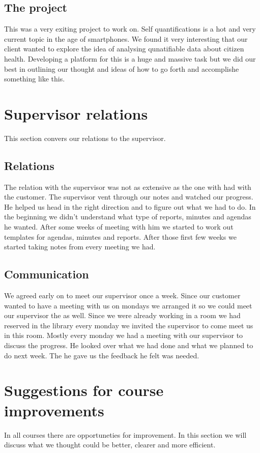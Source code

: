 \subsection{The project}
This was a very exiting project to work on. 
Self quantifications is a hot and very current topic in the age of smartphones.
We found it very interesting that our client wanted to explore the idea of analysing qunatifiable data about citizen health.
Developing a platform for this is a huge and massive task but we did our best in outlining our thought and ideas of how to go forth and accomplishe something like this. 

 
 
 
\section{Supervisor relations}
This section convers our relations to the supervisor. 
\subsection{Relations}
The relation with the supervisor was not as extensive as the one with had with the customer.
The supervisor vent through our notes and watched our progress.
He helped us head in the right direction and to figure out what we had to do.
In the beginning we didn't understand what type of reports, minutes and agendas he wanted. 
After some weeks of meeting with him we started to work out templates  for agendas, minutes and reports. 
After those first few weeks we started taking notes from every meeting we had.

\subsection{Communication}
We agreed early on to meet our supervisor once a week. 
Since our customer wanted to have a meeting with us on mondays we arranged it so we could meet our supervisor the as well.
Since we were already working in a room we had reserved in the library every monday we invited the supervisor to come meet us in this room.
Mostly every monday we had a meeting with our supervisor to discuss the progress.
He looked over what we had done and what we planned to do next week.
The he gave us the feedback he felt was needed.
 


\section{Suggestions for course improvements}
In all courses there are opportuneties for improvement.
In this section we will discuss what we thought could be better, clearer and more efficient.

